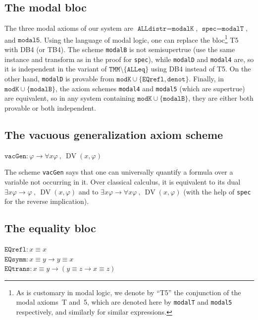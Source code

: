 \documentclass[11pt]{article}
\newcommand*{\comma}{\:,\:}
\renewcommand*{\phi}{\varphi}
\DeclareMathOperator{\DV}{DV}
\theoremstyle{plain}
\theoremstyle{definition}
\theoremstyle{remark}
\begin{document}
\subsection{The modal bloc}

The three modal axioms of our system are $\texttt{ALLdistr} = \texttt{modalK}$,
$\texttt{spec} = \texttt{modalT}$, and $\texttt{modal5}$.
Using the language of modal logic, one can replace the bloc\footnote{%
As is customary in modal logic, we denote by ``T5'' the conjunction of the modal axioms~T and~5,
which are denoted here by \texttt{modalT} and \texttt{modal5} respectively, and similarly for
similar expressions.} T5 with DB4 (or TB4).
The scheme \texttt{modalB} is not semisupertrue (use the same instance and transform as in the
proof for \texttt{spec}), while \texttt{modalD} and \texttt{modal4} are, so it is independent in
the variant of $\texttt{TMM} \setminus \{\texttt{ALLeq}\}$ using DB4 instead of T5.
On the other hand, \texttt{modalD} is provable from
$\texttt{modK} \cup \{ \texttt{EQrefl}, \texttt{denot} \}$.
Finally, in $\texttt{modK} \cup \{ \texttt{modalB}\}$, the axiom schemes \texttt{modal4} and
\texttt{modal5} (which are supertrue) are equivalent, so in any system containing
$\texttt{modK} \cup \{ \texttt{modalB} \}$, they are either both provable or both independent.



\subsection{The vacuous generalization axiom scheme}

$\texttt{vacGen}: \phi \to \forall x \phi \comma \DV(x, \phi)$
\vspace{0.5em}

The scheme \texttt{vacGen} says that one can universally quantify a formula over a variable not
occurring in it.
Over classical calculus, it is equivalent to its dual $\exists x \phi \to \phi \comma \DV(x, \phi)$
and to $\exists x \phi \to \forall x \phi \comma \DV(x, \phi)$ (with the help of \texttt{spec} for
the reverse implication).



\subsection{The equality bloc}

$\texttt{EQrefl}: x \equiv x$\\
$\texttt{EQsymm}: x \equiv y \to y \equiv x$\\
$\texttt{EQtrans}: x \equiv y \to (y \equiv z \to x \equiv z)$
\vspace{0.5em}
\end{document}
